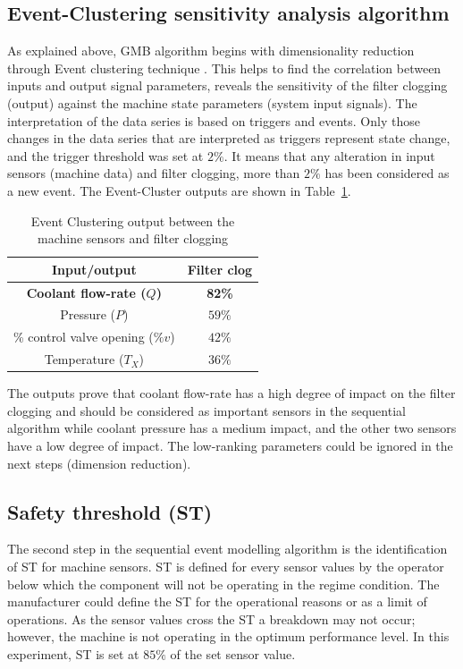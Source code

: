 \documentclass[conference]{IEEEtran}
\begin{document}
\subsection{Event-Clustering sensitivity analysis algorithm}
\label{subsec:event_clustering}
As explained above, GMB algorithm begins with dimensionality reduction through Event clustering technique \cite{Danishvar2018}. This helps to find the correlation between inputs and output signal parameters, reveals the sensitivity of the filter clogging (output) against the machine state parameters (system input signals). The interpretation of the data series is based on triggers and events. Only those changes in the data series that are interpreted as triggers represent state change, and the trigger threshold was set at $2\%$.   It means that any alteration in input sensors (machine data) and filter clogging, more than $2\%$ has been considered as a new event. The Event-Cluster outputs are shown in Table~\ref{tab:I}.
\begin{table}[tbp]
    \caption{Event Clustering output between the machine sensors and filter clogging}
    \begin{center}
        \begin{tabular}{|c|c|}
            \hline
            \textbf{Input/output}& \textbf{Filter clog} \\
            \hline
            \textbf{Coolant flow-rate ($Q$)} & \textbf{82\%}  \\
            \hline
            Pressure ($P$) & $59\%$ \\
            \hline
            \% control valve opening ($\%v$) & $42\%$ \\
            \hline
            Temperature ($T_X$) & $36\%$ \\
            \hline
        \end{tabular}
        \label{tab:I}
    \end{center}
\end{table}
The outputs prove that coolant flow-rate has a high degree of impact on the filter clogging and should be considered as important sensors in the sequential algorithm while coolant pressure has a medium impact, and the other two sensors have a low degree of impact. The low-ranking parameters could be ignored in the next steps (dimension reduction). 

\subsection{Safety threshold (ST)}
\label{subsec:ST}
The second step in the sequential event modelling algorithm is the identification of ST for machine sensors. ST is defined for every sensor values by the operator below which the component will not be operating in the regime condition. The manufacturer could define the ST for the operational reasons or as a limit of operations. As the sensor values cross the ST a breakdown may not occur; however, the machine is not operating in the optimum performance level. In this experiment, ST is set at $85\%$ of the set sensor value.
\end{document}
